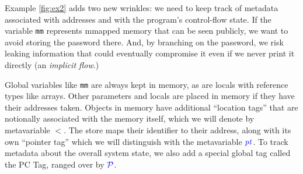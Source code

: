 \documentclass{llncs}
\begin{document}
{Example \ref{fig:ex2} adds two new wrinkles: we need to keep track of metadata associated with
addresses and with the program's control-flow state. If the variable {\tt mm} represents
mmapped memory  that can be seen publicly, we want to avoid storing the password there. And, by
branching on the password, we risk leaking information that could eventually compromise it even
if we never print it directly (an {\em implicit flow}.)

Global variables like {\tt mm} are always kept in memory, as are locals with reference types  like arrays.
Other parameters and locals are placed in memory if they have their addresses taken.
Objects in memory have additional ``location tags'' that are notionally associated with the memory
itself, which we will denote by metavariable \(\lt\). The store maps their identifier
to their address, along with its own ``pointer tag'' which we will distinguish with the
metavariable \(\mathit{\color{blue} pt}\). To track metadata about the overall system state, we also add
a special global tag called the PC Tag, ranged over by \(\mathcal{\color{blue} P}\).

\begin{figure}
\end{figure}}
\end{document}
